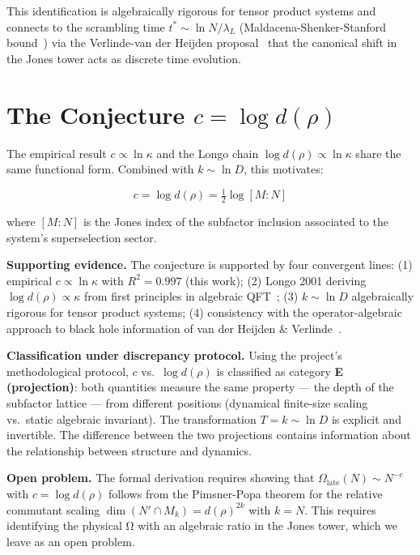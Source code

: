 \documentclass[aps,prl,twocolumn,superscriptaddress,showpacs]{revtex4-2}
\newcommand{\late}{\mathrm{late}}
\begin{document}
This identification is algebraically rigorous for tensor product systems
and connects to the scrambling time $t^* \sim \ln N/\lambda_L$
(Maldacena-Shenker-Stanford bound~\cite{Maldacena2016}) via the
Verlinde-van der Heijden proposal~\cite{vanderHeijden2024} that the
canonical shift in the Jones tower acts as discrete time evolution.

\section{The Conjecture $c = \log d(\rho)$}
\label{sec:conjecture}

The empirical result $c \propto \ln\kappa$ and the Longo chain
$\log d(\rho) \propto \ln\kappa$ share the same functional form.
Combined with $k \sim \ln D$, this motivates:

\begin{equation}
\boxed{c = \log d(\rho) = \tfrac{1}{2}\log[M:N]}
\label{eq:conjecture}
\end{equation}

where $[M:N]$ is the Jones index of the subfactor inclusion associated
to the system's superselection sector.

\textbf{Supporting evidence.}
The conjecture is supported by four convergent lines:
(1) empirical $c \propto \ln\kappa$ with $R^2 = 0.997$ (this work);
(2) Longo 2001 deriving $\log d(\rho) \propto \kappa$ from first
    principles in algebraic QFT~\cite{Longo2001};
(3) $k \sim \ln D$ algebraically rigorous for tensor product systems;
(4) consistency with the operator-algebraic approach to black hole
    information of van der Heijden \& Verlinde~\cite{vanderHeijden2024}.

\textbf{Classification under discrepancy protocol.}
Using the project's methodological protocol, $c$ vs.\ $\log d(\rho)$
is classified as category \textbf{E (projection)}: both quantities measure
the same property --- the depth of the subfactor lattice --- from different
positions (dynamical finite-size scaling vs.\ static algebraic invariant).
The transformation $T = k\sim\ln D$ is explicit and invertible. The
difference between the two projections contains information about the
relationship between structure and dynamics.

\textbf{Open problem.}
The formal derivation requires showing that
$\Omega_\late(N) \sim N^{-c}$ with $c = \log d(\rho)$ follows from
the Pimsner-Popa theorem for the relative commutant scaling
$\dim(N'\cap M_k) = d(\rho)^{2k}$ with $k = N$. This requires
identifying the physical Ω with an algebraic ratio in the Jones tower,
which we leave as an open problem.
\end{document}
